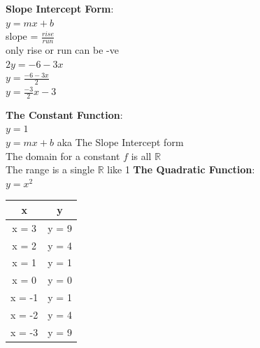 \documentclass[10pt]{article}
\begin{document}
\textbf{Slope Intercept Form}: \\
\(y = mx + b\) \\
slope = \( \frac{rise}{run}\) \\
only rise or run can be -ve \\
\hspace*{1em} \(2y = -6 -3x\) \\
\hspace*{1em} \(y = \frac{-6-3x}{2}\) \\
\hspace*{1em} \(y = \frac{-3}{2}x - 3\)


\textbf{The Constant Function}: \\
\(y = 1\) \\
\(y = mx + b\) aka The Slope Intercept form \\
The domain for a constant \(f\) is all \(\mathbb{R} \) \\
The range is a single \(\mathbb{R} \) like 1
\clearpage
\textbf{The Quadratic Function}: \\
\(y = x^2 \) \\
\begin{tabular}{|c|c|}
    \hline
    x      & y     \\
    \hline
    x = 3  & y = 9 \\
    x = 2  & y = 4 \\
    x = 1  & y = 1 \\
    x = 0  & y = 0 \\
    x = -1 & y = 1 \\
    x = -2 & y = 4 \\
    x = -3 & y = 9 \\
    \hline
\end{tabular}


\end{document}
